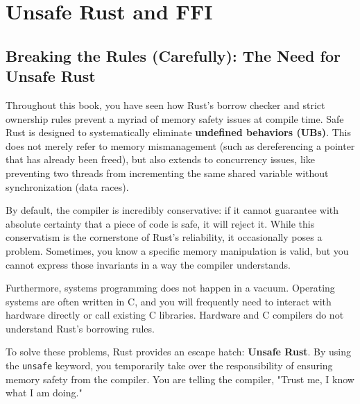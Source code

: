 \chapter{Unsafe Rust and FFI}

\section{Breaking the Rules (Carefully): The Need for Unsafe Rust}

Throughout this book, you have seen how Rust's borrow checker and strict ownership rules prevent a myriad of memory safety issues at compile time. Safe Rust is designed to systematically eliminate \textbf{undefined behaviors (UBs)}. This does not merely refer to memory mismanagement (such as dereferencing a pointer that has already been freed), but also extends to concurrency issues, like preventing two threads from incrementing the same shared variable without synchronization (data races).

By default, the compiler is incredibly conservative: if it cannot guarantee with absolute certainty that a piece of code is safe, it will reject it. While this conservatism is the cornerstone of Rust's reliability, it occasionally poses a problem. Sometimes, you know a specific memory manipulation is valid, but you cannot express those invariants in a way the compiler understands. 

Furthermore, systems programming does not happen in a vacuum. Operating systems are often written in C, and you will frequently need to interact with hardware directly or call existing C libraries. Hardware and C compilers do not understand Rust's borrowing rules. 

To solve these problems, Rust provides an escape hatch: \textbf{Unsafe Rust}. By using the \texttt{unsafe} keyword, you temporarily take over the responsibility of ensuring memory safety from the compiler. You are telling the compiler, "Trust me, I know what I am doing." 

